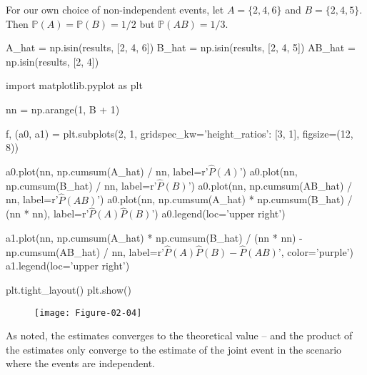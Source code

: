 For our own choice of non-independent events, let \(A = \{ 2, 4, 6\}\)
and \(B = \{2, 4, 5\}\). Then \(\mathbb{P}(A) = \mathbb{P}(B) = 1/2\)
but \(\mathbb{P}(AB) = 1/3\).

\begin{python}
A_hat = np.isin(results, [2, 4, 6])
B_hat = np.isin(results, [2, 4, 5])
AB_hat = np.isin(results, [2, 4])
\end{python}

\begin{python}
import matplotlib.pyplot as plt

nn = np.arange(1, B + 1)

f, (a0, a1) = plt.subplots(2, 1, gridspec_kw={'height_ratios': [3, 1]}, figsize=(12, 8))

a0.plot(nn, np.cumsum(A_hat) / nn, label=r'$\hat{P}(A)$')
a0.plot(nn, np.cumsum(B_hat) / nn, label=r'$\hat{P}(B)$')
a0.plot(nn, np.cumsum(AB_hat) / nn, label=r'$\hat{P}(AB)$')
a0.plot(nn, np.cumsum(A_hat) * np.cumsum(B_hat) / (nn * nn), label=r'$\hat{P}(A) \hat{P}(B)$')
a0.legend(loc='upper right')

a1.plot(nn, np.cumsum(A_hat) * np.cumsum(B_hat) / (nn * nn) - np.cumsum(AB_hat) / nn, 
         label=r'$\hat{P}(A) \hat{P}(B)- \hat{P}(AB)$', color='purple')
a1.legend(loc='upper right')

plt.tight_layout()
plt.show()
\end{python}

\begin{figure}[H]
\texttt{[image: Figure-02-04]}
\end{figure}

As noted, the estimates converges to the theoretical value -- and the
product of the estimates only converge to the estimate of the joint
event in the scenario where the events are independent.

